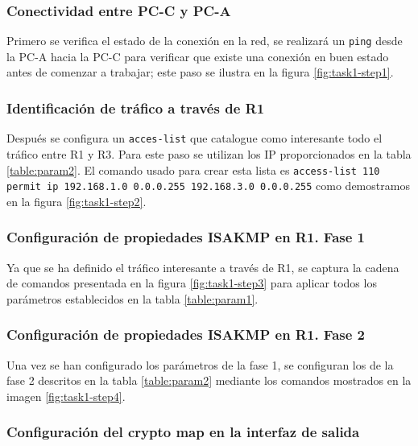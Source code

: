 \documentclass{article}
\begin{document}
            \subsubsection{Conectividad entre PC-C y PC-A}

                Primero se verifica el estado de la conexión en la red, se realizará un \texttt{ping} desde la PC-A hacia la PC-C para verificar que existe una conexión en buen estado antes de comenzar a trabajar; este paso se ilustra en la figura \ref{fig:task1-step1}.

            \subsubsection{Identificación de tráfico a través de R1}

                Después se configura un \texttt{acces-list} que catalogue como interesante todo el tráfico entre R1 y R3. Para este paso se utilizan los IP proporcionados en la tabla \ref{table:param2}. El comando usado para crear esta lista es \texttt{access-list 110 permit ip 192.168.1.0 0.0.0.255 192.168.3.0 0.0.0.255} como demostramos en la figura \ref{fig:task1-step2}.

            \subsubsection{Configuración de propiedades ISAKMP en R1. Fase 1}

                Ya que se ha definido el tráfico interesante a través de R1, se captura la cadena de comandos presentada en la figura \ref{fig:task1-step3} para aplicar todos los parámetros establecidos en la tabla \ref{table:param1}.

            \subsubsection{Configuración de propiedades ISAKMP en R1. Fase 2}

                Una vez se han configurado los parámetros de la fase 1, se configuran los de la fase 2 descritos en la tabla \ref{table:param2} mediante los comandos mostrados en la imagen \ref{fig:task1-step4}.

            \subsubsection{Configuración del crypto map en la interfaz de salida}
\end{document}
